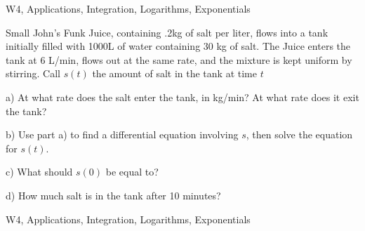 \begin{tagblock}{W4, Applications, Integration, Logarithms, Exponentials}
\begin{question}
	
 Small John's Funk Juice, containing .2kg of salt per liter, flows into a tank initially filled with 1000L of water containing 30 kg of salt. The Juice enters the tank at 6 L/min, flows out at the same rate, and the mixture is kept uniform by stirring. Call $s(t)$ the amount of salt in the tank at time $t$ 

\bigskip



\bigskip

a) At what rate does the salt enter the tank, in kg/min? At what rate does it exit the tank?

\bigskip

b) Use part a) to find a differential equation involving $s$, then solve the equation for $s(t)$. 

\bigskip

c) What should $s(0)$ be equal to?

\bigskip

d) How much salt is in the tank after 10 minutes? 

    
\begin{tags}
        W4, Applications, Integration, Logarithms, Exponentials
\end{tags}
    
\begin{diary}
\end{diary}
	
\begin{solution}

\end{solution}
	
\end{question}

\end{tagblock}


